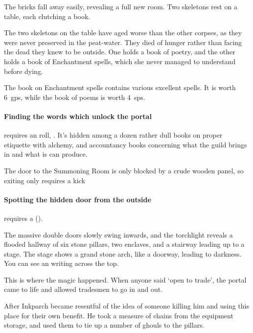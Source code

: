 \begin{boxtext}

  The bricks fall away easily, revealing a full new room.  Two skeletons rest on a table, each clutching a book.

\end{boxtext}


\begin{exampletext}
  The two skeletons on the table have aged worse than the other corpses, as they were never preserved in the peat-water.
  They died of hunger rather than facing the dead they knew to be outside.
  One holds a book of poetry, and the other holds a book of Enchantment spells, which she never managed to understand before dying.
\end{exampletext}

The book on Enchantment spells contains various excellent spells.
It is worth 6~\glspl{gp}, while the book of poems is worth 4~\glspl{sp}.

\paragraph{Finding the words which unlock the portal}
requires an  roll, \tn[9].
It's hidden among a dozen rather dull books on proper etiquette with alchemy, and accountancy books concerning what the guild brings in and what is can produce.

The door to the Summoning Room is only blocked by a crude wooden panel, so exiting only requires a kick

\paragraph{Spotting the hidden door from the outside}
requires a  (\tn[8]).

\begin{boxtext}
  The massive double doors slowly swing inwards, and the torchlight reveals a flooded hallway of six stone pillars, two enclaves, and a stairway leading up to a stage.
  The stage shows a grand stone arch, like a doorway, leading to darkness.
  You can see an writing across the top.
\end{boxtext}


\begin{exampletext}
  This is where the magic happened.
  When anyone said `open to trade', the portal came to life and allowed tradesmen to go in and out.

  After Inkparch became resentful of the idea of someone killing him and using this place for their own benefit.
  He took a measure of chains from the equipment storage, and used them to tie up a number of ghouls to the pillars.
\end{exampletext}

